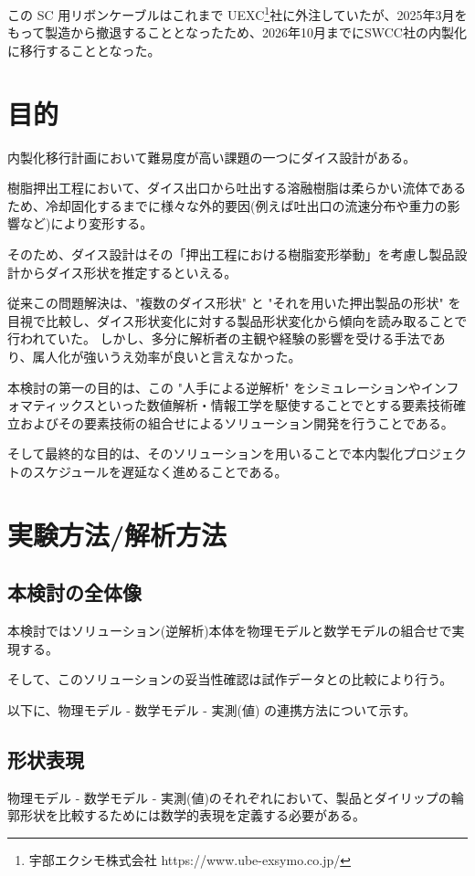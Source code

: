 \documentclass[report]{jlreq}
\begin{document}
この SC 用リボンケーブルはこれまで UEXC\footnote{宇部エクシモ株式会社 https://www.ube-exsymo.co.jp/}社に外注していたが、2025年3月をもって製造から撤退することとなったため、2026年10月までにSWCC社の内製化に移行することとなった。

\chapter{目的}
内製化移行計画において難易度が高い課題の一つにダイス設計がある。

樹脂押出工程において、ダイス出口から吐出する溶融樹脂は柔らかい流体であるため、冷却固化するまでに様々な外的要因({\small 例えば吐出口の流速分布や重力の影響など})により変形する。

そのため、ダイス設計はその「押出工程における樹脂変形挙動」を考慮し製品設計からダイス形状を推定するといえる。

従来この問題解決は、"複数のダイス形状" と "それを用いた押出製品の形状" を目視で比較し、ダイス形状変化に対する製品形状変化から傾向を読み取ることで行われていた。
しかし、多分に解析者の主観や経験の影響を受ける手法であり、属人化が強いうえ効率が良いと言えなかった。

本検討の第一の目的は、この "人手による逆解析" をシミュレーションやインフォマティックスといった数値解析・情報工学を駆使することでとする要素技術確立およびその要素技術の組合せによるソリューション開発を行うことである。

そして最終的な目的は、そのソリューションを用いることで本内製化プロジェクトのスケジュールを遅延なく進めることである。


\chapter{実験方法/解析方法}
\section{本検討の全体像}
本検討ではソリューション({\small 逆解析})本体を物理モデルと数学モデルの組合せで実現する。

そして、このソリューションの妥当性確認は試作データとの比較により行う。

以下に、物理モデル - 数学モデル - 実測({\small 値}) の連携方法について示す。

\section{形状表現}
物理モデル - 数学モデル - 実測(値)のそれぞれにおいて、製品とダイリップの輪郭形状を比較するためには数学的表現を定義する必要がある。
\end{document}
